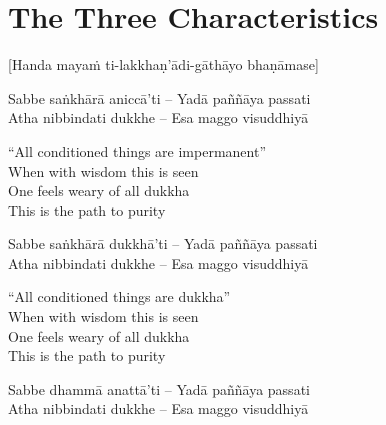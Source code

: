 
\section{The Three Characteristics}
\label{three-characteristics}

\begin{center}
  [Handa mayaṁ ti-lakkhaṇ’ādi-gāthāyo bhaṇāmase]
\end{center}

\begin{twochants}
  Sabbe saṅkhārā aniccā’ti – Yadā paññāya passati\\
  Atha nibbindati dukkhe – Esa maggo visuddhiyā\\
\end{twochants}

\begin{english}
  “All conditioned things are impermanent”\\
  When with wisdom this is seen\\
  One feels weary of all dukkha\\
  This is the path to purity
\end{english}

\begin{twochants}
  Sabbe saṅkhārā dukkhā’ti – Yadā paññāya passati\\
  Atha nibbindati dukkhe – Esa maggo visuddhiyā\\
\end{twochants}

\begin{english}
  “All conditioned things are dukkha”\\
  When with wisdom this is seen\\
  One feels weary of all dukkha\\
  This is the path to purity
\end{english}

\begin{twochants}
  Sabbe dhammā anattā’ti – Yadā paññāya passati\\
  Atha nibbindati dukkhe – Esa maggo visuddhiyā\\
\end{twochants}

